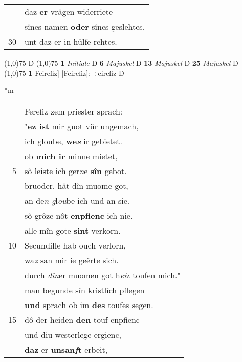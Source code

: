 \documentclass[8pt,a4paper,notitlepage]{article}
\begin{document}
\begin{table}[ht]
\begin{minipage}[t]{0.5\linewidth}
\begin{tabular}{rl}
 & daz \textbf{er} vrâgen widerriete\\ 
 & sînes namen \textbf{oder} sînes geslehtes,\\ 
30 & unt daz er in hülfe rehtes.\\ 
\end{tabular}
\scriptsize
\line(1,0){75} \newline
D \newline
\line(1,0){75} \newline
\textbf{1} \textit{Initiale} D  \textbf{6} \textit{Majuskel} D  \textbf{13} \textit{Majuskel} D  \textbf{25} \textit{Majuskel} D  \newline
\line(1,0){75} \newline
\textbf{1} Feirefiz] [Feirefiz]: ÷eirefiz D \newline
\end{minipage}
\hspace{0.5cm}
\begin{minipage}[t]{0.5\linewidth}
\small
\begin{center}*m
\end{center}
\begin{tabular}{rl}
 & Ferefiz zem priester sprach:\\ 
 & "\textbf{ez ist} mir guot vür ungemach,\\ 
 & ich gloube, \textbf{we\textit{s}} ir gebietet.\\ 
 & ob \textbf{mich ir} minne mietet,\\ 
5 & sô leiste ich ger\textit{n}e \textbf{sîn} gebot.\\ 
 & bruoder, hât dîn muome got,\\ 
 & an de\textit{n g}l\textit{ou}be ich und an sie.\\ 
 & sô grôze nôt \textbf{enpfienc} ich nie.\\ 
 & alle mîn gote \textbf{sint} verkorn.\\ 
10 & Secundille hab ouch verlorn,\\ 
 & wa\textit{z} san mir ie geêrte sich.\\ 
 & durch \textit{dîn}er muomen got h\textit{ei}z toufen mich."\\ 
 & man begunde sîn kristlîch pflegen\\ 
 & \textbf{und} sprach ob im \textbf{des} toufes segen.\\ 
15 & dô der heiden \textbf{den} touf enpfienc\\ 
 & und diu westerlege ergienc,\\ 
 & \textbf{daz} er \textbf{unsan\textit{f}t} erbeit,\\ 

\end{tabular}
\end{minipage}
\end{table}
\end{document}
